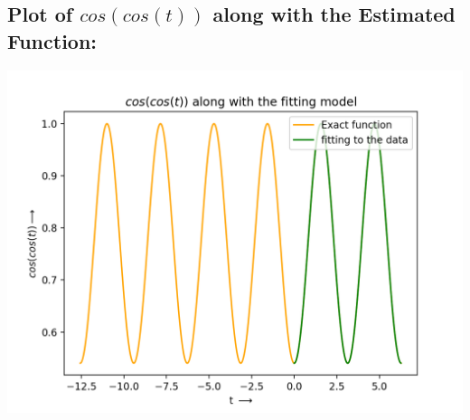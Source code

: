 \documentclass[10pt,english, openany]{book}
\begin{document}
\subsection{Plot of $cos(cos(t))$ along with the Estimated Function:}
{\centering\includegraphics[scale=0.7]{Figure_2.png}}
\end{document}
